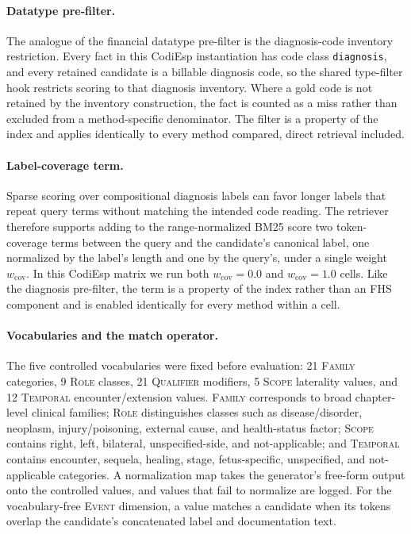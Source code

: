 \paragraph{Datatype pre-filter.}
The analogue of the financial datatype pre-filter is the diagnosis-code
inventory restriction. Every fact in this CodiEsp instantiation has code class
\texttt{diagnosis}, and every retained candidate is a billable diagnosis code,
so the shared type-filter hook restricts scoring to that diagnosis inventory.
Where a gold code is not retained by the inventory construction, the fact is
counted as a miss rather than excluded from a method-specific denominator. The
filter is a property of the index and applies identically to every method
compared, direct retrieval included.

\paragraph{Label-coverage term.}
Sparse scoring over compositional diagnosis labels can favor longer labels that
repeat query terms without matching the intended code reading. The retriever
therefore supports adding to the range-normalized BM25 score two token-coverage
terms between the query and the candidate's canonical label, one normalized by
the label's length and one by the query's, under a single weight
$w_{\mathrm{cov}}$. In this CodiEsp matrix we run both
$w_{\mathrm{cov}}=0.0$ and $w_{\mathrm{cov}}=1.0$ cells. Like the diagnosis
pre-filter, the term is a property of the index rather than an FHS component
and is enabled identically for every method within a cell.

\paragraph{Vocabularies and the match operator.}
The five controlled vocabularies were fixed before evaluation: 21
\textsc{Family} categories, 9 \textsc{Role} classes, 21 \textsc{Qualifier}
modifiers, 5 \textsc{Scope} laterality values, and 12 \textsc{Temporal}
encounter/extension values. \textsc{Family} corresponds to broad chapter-level
clinical families; \textsc{Role} distinguishes classes such as
disease/disorder, neoplasm, injury/poisoning, external cause, and
health-status factor; \textsc{Scope} contains right, left, bilateral,
unspecified-side, and not-applicable; and \textsc{Temporal} contains encounter,
sequela, healing, stage, fetus-specific, unspecified, and not-applicable
categories. A normalization map takes the generator's free-form output onto the
controlled values, and values that fail to normalize are logged. For the
vocabulary-free \textsc{Event} dimension, a value matches a candidate when its
tokens overlap the candidate's concatenated label and documentation text.

